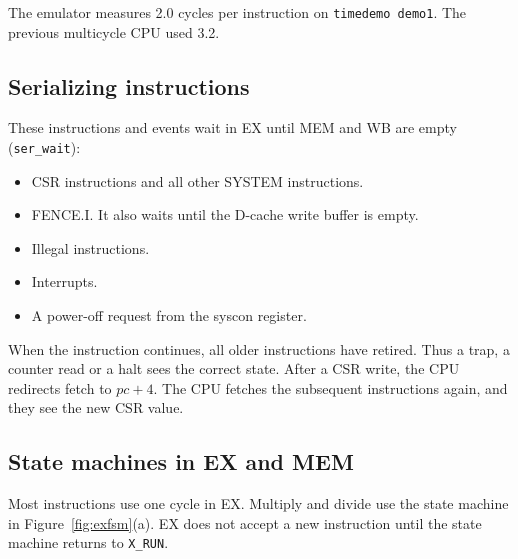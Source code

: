 The emulator measures 2.0 cycles per instruction on \texttt{timedemo demo1}. The previous multicycle CPU used 3.2.

\subsection{Serializing instructions}

These instructions and events wait in EX until MEM and WB are empty (\texttt{ser\_wait}):

\begin{itemize}
  \item CSR instructions and all other SYSTEM instructions.
  \item FENCE.I. It also waits until the D-cache write buffer is empty.
  \item Illegal instructions.
  \item Interrupts.
  \item A power-off request from the syscon register.
\end{itemize}

When the instruction continues, all older instructions have retired. Thus a trap, a counter read or a halt sees the correct state. After a CSR write, the CPU redirects fetch to $pc + 4$. The CPU fetches the subsequent instructions again, and they see the new CSR value.

\subsection{State machines in EX and MEM}

Most instructions use one cycle in EX. Multiply and divide use the state machine in Figure~\ref{fig:exfsm}(a). EX does not accept a new instruction until the state machine returns to \texttt{X\_RUN}.

